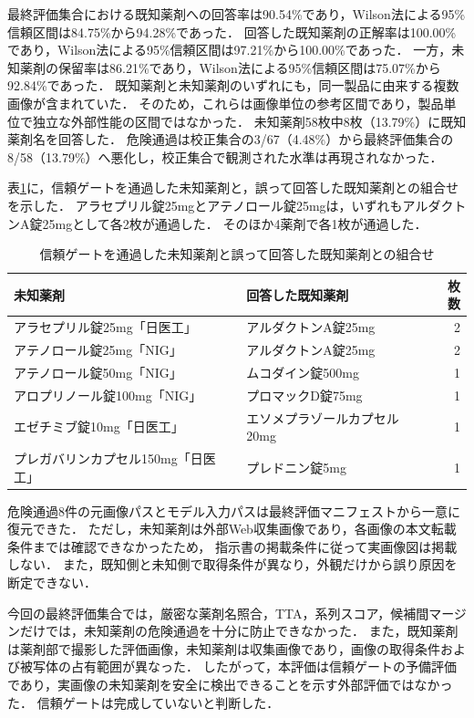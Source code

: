 \documentclass[uplatex,dvipdfmx]{jsarticle}
\begin{document}
最終評価集合における既知薬剤への回答率は90.54\%であり，Wilson法による95\%信頼区間は84.75\%から94.28\%であった．
回答した既知薬剤の正解率は100.00\%であり，Wilson法による95\%信頼区間は97.21\%から100.00\%であった．
一方，未知薬剤の保留率は86.21\%であり，Wilson法による95\%信頼区間は75.07\%から92.84\%であった．
既知薬剤と未知薬剤のいずれにも，同一製品に由来する複数画像が含まれていた．
そのため，これらは画像単位の参考区間であり，製品単位で独立な外部性能の区間ではなかった．
未知薬剤58枚中8枚（13.79\%）に既知薬剤名を回答した．
危険通過は校正集合の3/67（4.48\%）から最終評価集合の8/58（13.79\%）へ悪化し，校正集合で観測された水準は再現されなかった．

表\ref{tab:trust_gate_unsafe}に，信頼ゲートを通過した未知薬剤と，誤って回答した既知薬剤との組合せを示した．
アラセプリル錠25mgとアテノロール錠25mgは，いずれもアルダクトンA錠25mgとして各2枚が通過した．
そのほか4薬剤で各1枚が通過した．

\begin{table}[H]
  \centering
  \caption{信頼ゲートを通過した未知薬剤と誤って回答した既知薬剤との組合せ}
  \label{tab:trust_gate_unsafe}
  \small
  \begin{tabular}{|p{5.0cm}|p{5.0cm}|r|}
    \hline
    未知薬剤 & 回答した既知薬剤 & 枚数 \\ \hline
    アラセプリル錠25mg「日医工」 & アルダクトンA錠25mg & 2 \\ \hline
    アテノロール錠25mg「NIG」 & アルダクトンA錠25mg & 2 \\ \hline
    アテノロール錠50mg「NIG」 & ムコダイン錠500mg & 1 \\ \hline
    アロプリノール錠100mg「NIG」 & プロマックD錠75mg & 1 \\ \hline
    エゼチミブ錠10mg「日医工」 & エソメプラゾールカプセル20mg & 1 \\ \hline
    プレガバリンカプセル150mg「日医工」 & プレドニン錠5mg & 1 \\ \hline
  \end{tabular}
\end{table}

危険通過8件の元画像パスとモデル入力パスは最終評価マニフェストから一意に復元できた．
ただし，未知薬剤は外部Web収集画像であり，各画像の本文転載条件までは確認できなかったため，
指示書の掲載条件に従って実画像図は掲載しない．
また，既知側と未知側で取得条件が異なり，外観だけから誤り原因を断定できない．

今回の最終評価集合では，厳密な薬剤名照合，TTA，系列スコア，候補間マージンだけでは，未知薬剤の危険通過を十分に防止できなかった．
また，既知薬剤は薬剤部で撮影した評価画像，未知薬剤は収集画像であり，画像の取得条件および被写体の占有範囲が異なった．
したがって，本評価は信頼ゲートの予備評価であり，実画像の未知薬剤を安全に検出できることを示す外部評価ではなかった．
信頼ゲートは完成していないと判断した．
\end{document}
